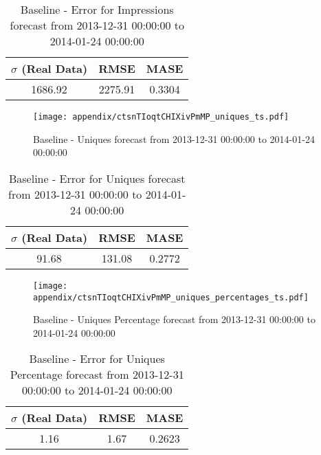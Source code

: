 \begin{table}[H]
\centering
\footnotesize
\begin{tabular}{ccc}
$\sigma$ (Real Data) & RMSE & MASE   \\ \hline
1686.92 & 2275.91 & 0.3304 \\
\end{tabular}

\vspace{0.5cm}

\caption{
Baseline - Error for Impressions forecast from 2013-12-31 00:00:00 to 2014-01-24 00:00:00}
\end{table}

\begin{figure}[H] \begin{center} \leavevmode
\texttt{[image: appendix/ctsnTIoqtCHIXivPmMP\_uniques\_ts.pdf]} \caption{
Baseline - Uniques forecast from 2013-12-31 00:00:00 to 2014-01-24 00:00:00} \label{fig:appendix/ctsnTIoqtCHIXivPmMP_uniques_ts.pdf} \end{center}
\end{figure}

\begin{table}[H]
\centering
\footnotesize
\begin{tabular}{ccc}
$\sigma$ (Real Data) & RMSE & MASE   \\ \hline
91.68 & 131.08 & 0.2772 \\
\end{tabular}

\vspace{0.5cm}

\caption{
Baseline - Error for Uniques forecast from 2013-12-31 00:00:00 to 2014-01-24 00:00:00}
\end{table}

\begin{figure}[H] \begin{center} \leavevmode
\texttt{[image: appendix/ctsnTIoqtCHIXivPmMP\_uniques\_percentages\_ts.pdf]} \caption{
Baseline - Uniques Percentage forecast from 2013-12-31 00:00:00 to 2014-01-24 00:00:00} \label{fig:appendix/ctsnTIoqtCHIXivPmMP_uniques_percentages_ts.pdf} \end{center}
\end{figure}

\begin{table}[H]
\centering
\footnotesize
\begin{tabular}{ccc}
$\sigma$ (Real Data) & RMSE & MASE   \\ \hline
1.16 & 1.67 & 0.2623 \\
\end{tabular}

\vspace{0.5cm}

\caption{
Baseline - Error for Uniques Percentage forecast from 2013-12-31 00:00:00 to 2014-01-24 00:00:00}
\end{table}

